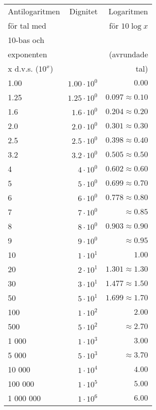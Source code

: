 \begin{tabular}{l|r|r}
Antilogaritmen    & Dignitet & Logaritmen            \\
för tal med       &          & för $10\log x$        \\
10-bas och        &          &                       \\
exponenten        &          & (avrundade            \\
x d.v.s. ($10^x$) &          & tal)                  \\ \hline
1.00      & $1.00 \cdot 10^0$ & $0.00$               \\
1.25      & $1.25 \cdot 10^0$ & $0.097 \approx 0.10$ \\
1.6       & $1.6 \cdot 10^0$ & $0.204 \approx 0.20$  \\
2.0       & $2.0 \cdot 10^0$ & $0.301 \approx 0.30$  \\
2.5       & $2.5 \cdot 10^0$ & $0.398 \approx 0.40$  \\
3.2       & $3.2 \cdot 10^0$ & $0.505 \approx 0.50$  \\
4         & $4 \cdot 10^0$   & $0.602 \approx 0.60$  \\
5         & $5 \cdot 10^0$   & $0.699 \approx 0.70$  \\
6         & $6 \cdot 10^0$   & $0.778 \approx 0.80$  \\
7         & $7 \cdot 10^0$   & $\approx 0.85$        \\
8         & $8 \cdot 10^0$   & $0.903 \approx 0.90$  \\
9         & $9 \cdot 10^0$   & $\approx 0.95$        \\
10        & $1 \cdot 10^1$   & $1.00$                \\
20        & $2 \cdot 10^1$   & $1.301 \approx 1.30$  \\
30        & $3 \cdot 10^1$   & $1.477 \approx 1.50$  \\
50        & $5 \cdot 10^1$   & $1.699 \approx 1.70$  \\
100       & $1 \cdot 10^2$   & $2.00$                \\
500       & $5 \cdot 10^2$   & $\approx 2.70$        \\
1 000     & $1 \cdot 10^3$   & $3.00$                \\
5 000     & $5 \cdot 10^3$   & $\approx3.70$         \\
10 000    & $1 \cdot 10^4$   & $4.00$                \\
100 000   & $1 \cdot 10^5$   & $5.00$                \\
1 000 000 & $1 \cdot 10^6$   & $6.00$                \\
\end{tabular}

